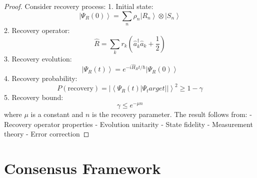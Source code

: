 \documentclass[12pt]{article}
\newcommand{\ket}[1]{\left|#1\right\rangle}
\newcommand{\braket}[2]{\left\langle#1|#2\right\rangle}
\newcommand{\op}[1]{\hat{#1}}
\begin{document}
\begin{proof}
Consider recovery process:
1. Initial state:
\begin{equation}
\ket{\Psi_R(0)} = \sum_n \rho_n\ket{R_n} \otimes \ket{S_n}
\end{equation}
2. Recovery operator:
\begin{equation}
\op{R} = \sum_k r_k(\op{a}_k^\dagger\op{a}_k + \frac{1}{2})
\end{equation}
3. Recovery evolution:
\begin{equation}
\ket{\Psi_R(t)} = e^{-i\op{H}_Rt/\hbar}\ket{\Psi_R(0)}
\end{equation}
4. Recovery probability:
\begin{equation}
P(\text{recovery}) = |\braket{\Psi_R(t)|\Psi_target}|^2 \geq 1 - \gamma
\end{equation}
5. Recovery bound:
\begin{equation}
\gamma \leq e^{-\mu n}
\end{equation}
where $\mu$ is a constant and $n$ is the recovery parameter.
The result follows from:
- Recovery operator properties
- Evolution unitarity
- State fidelity
- Measurement theory
- Error correction
\end{proof}
\section{Consensus Framework}
\end{document}
